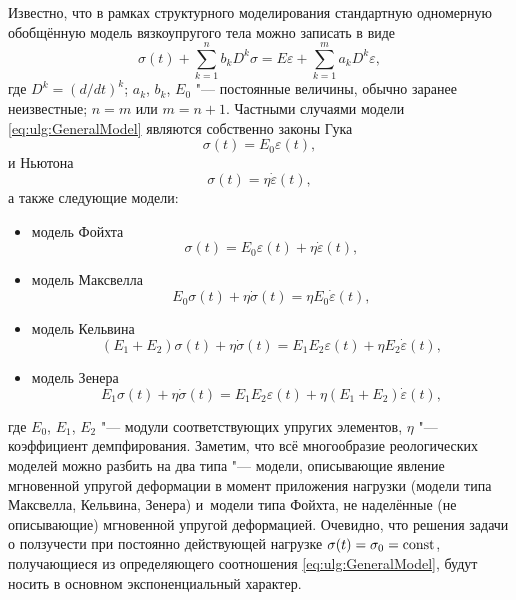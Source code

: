 Известно, что в рамках структурного моделирования стандартную одномерную обобщённую модель вязкоупругого тела можно записать в виде 
\begin{equation}\label{eq:ulg:GeneralModel}
\sigma(t)+\sum^{n}_{k=1}b_{k}D^{k}\sigma=E\varepsilon+\sum^{m}_{k=1}a_{k}D^{k}\varepsilon,
\end{equation}
где $D^{k}=\left(d/dt\right)^{k}$; $a_{k}$, $b_{k}$, $E_{0}$ "--- постоянные величины, обычно заранее неизвестные; $n=m$ или $m=n+1$. 
Частными случаями модели \eqref{eq:ulg:GeneralModel} являются собственно законы Гука 
$$\sigma(t)=E_{0}\varepsilon(t),$$ и Ньютона $$\sigma(t)=\eta\dot{\varepsilon}(t),$$ а также следующие модели: 
\begin{itemize}
\item модель Фойхта
\begin{equation}\label{eq:ulg:Voigt}
\sigma(t)=E_{0}\varepsilon(t)+\eta\dot{\varepsilon}(t),
\end{equation}
\item модель Максвелла
\begin{equation}\label{eq:ulg:Maxwell}
 E_{0}\sigma(t)+\eta\dot{\sigma}(t)=\eta E_{0}\dot{\varepsilon}(t),
\end{equation}
\item модель Кельвина
\begin{equation}\label{eq:ulg:Kelvin}
\left(E_{1}+E_{2}\right)\sigma(t)+\eta\dot{\sigma}(t)=E_{1}E_{2}\varepsilon(t)+\eta E_{2}\dot{\varepsilon}(t),
\end{equation}
\item модель Зенера
 \begin{equation}\label{eq:ulg:Zener}
 E_{1}\sigma(t)+\eta\dot{\sigma}(t)=E_{1}E_{2}\varepsilon(t)+\eta(E_{1}+E_{2})\dot{\varepsilon}(t),
\end{equation}
\end{itemize}
где $E_{0}$, $E_{1}$, $E_{2}$ "---  модули соответствующих упругих элементов, $\eta$ "---  коэффициент демпфирования. 
Заметим, что всё многообразие реологических моделей можно разбить на два типа "---  модели, описывающие явление мгновенной упругой деформации в момент приложения нагрузки (модели типа Максвелла, Кельвина, Зенера) 
и~модели типа Фойхта, не наделённые (не описывающие) мгновенной упругой деформацией. 
Очевидно, что решения задачи о ползучести при постоянно действующей нагрузке $\sigma(t)=\sigma_{0}=\rm const$, получающиеся из определяющего соотношения \eqref{eq:ulg:GeneralModel}, будут носить в основном экспоненциальный характер. 



